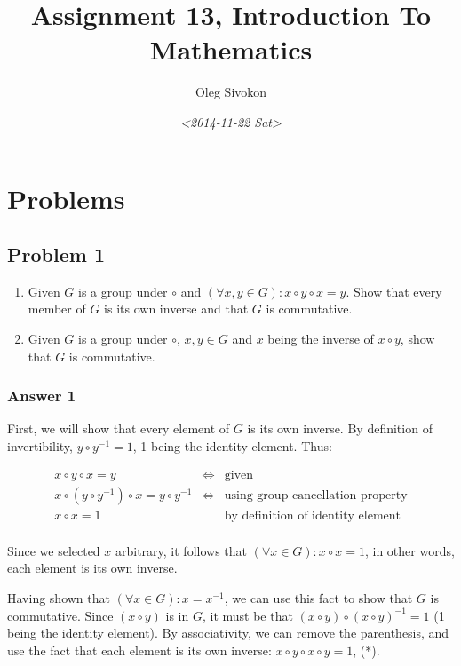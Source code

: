 \documentclass[11pt]{article}
\author{Oleg Sivokon}
\date{\textit{<2014-11-22 Sat>}}
\title{Assignment 13, Introduction To Mathematics}
\begin{document}
\maketitle
\tableofcontents


\clearpage

\section{Problems}
\label{sec-1}

\subsection{Problem 1}
\label{sec-1-1}

\begin{enumerate}
\item Given $G$ is a group under $\circ$ and $(\forall x, y \in G): x \circ y \circ x = y$.
Show that every member of $G$ is its own inverse and that $G$ is commutative.

\item Given $G$ is a group under $\circ$, $x, y \in G$ and $x$ being the inverse of 
      $x \circ y$, show that $G$ is commutative.
\end{enumerate}

\subsubsection{Answer 1}
\label{sec-1-1-1}

First, we will show that every element of $G$ is its own inverse.  By definition of
invertibility, $y \circ y^{-1} = 1$, 1 being the identity element.  Thus:

\begin{equation*}
  \begin{array}{lll}
    x \circ y \circ x = y & \iff &
    \textrm{given} \\
    x \circ (y \circ y^{-1}) \circ x = y \circ y^{-1} & \iff &
    \textrm{using group cancellation property} \\
    x \circ x = 1 & &
    \textrm{by definition of identity element} \\
  \end{array}
\end{equation*}

Since we selected $x$ arbitrary, it follows that
$(\forall x \in G): x \circ x = 1$, in other words, each element is its own inverse.

Having shown that $(\forall x \in G): x = x^{-1}$, we can use this fact to show that
$G$ is commutative.  Since $(x \circ y)$ is in $G$, it must be that
$(x \circ y) \circ (x \circ y)^{-1} = 1$ (1 being the identity element).  By
associativity, we can remove the parenthesis, and use the fact that each element
is its own inverse: $x \circ y \circ x \circ y = 1$, (*).
\end{document}
